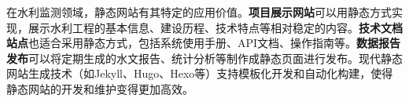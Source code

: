 在水利监测领域，静态网站有其特定的应用价值。\textbf{项目展示网站}可以用静态方式实现，展示水利工程的基本信息、建设历程、技术特点等相对稳定的内容。\textbf{技术文档站点}也适合采用静态方式，包括系统使用手册、API文档、操作指南等。\textbf{数据报告发布}可以将定期生成的水文报告、统计分析等制作成静态页面进行发布。现代静态网站生成技术（如Jekyll、Hugo、Hexo等）支持模板化开发和自动化构建，使得静态网站的开发和维护变得更加高效。

\begin{Shaded}
\begin{Highlighting}[]
\DataTypeTok{\textgreater{}}
\DataTypeTok{\textless{}}\OperatorTok{=}\DataTypeTok{\textgreater{}}
\DataTypeTok{\textless{}}\DataTypeTok{\textgreater{}}
    \DataTypeTok{\textless{}}\OperatorTok{=}\DataTypeTok{\textgreater{}}
    \DataTypeTok{\textless{}}\OperatorTok{=}\OperatorTok{=}\DataTypeTok{\textgreater{}}
    \DataTypeTok{\textless{}}\DataTypeTok{\textgreater{}}\DataTypeTok{\textless{}/}\DataTypeTok{\textgreater{}}
    \DataTypeTok{\textless{}}\OperatorTok{=}\OperatorTok{=}\DataTypeTok{\textgreater{}}
\DataTypeTok{\textless{}/}\DataTypeTok{\textgreater{}}
\DataTypeTok{\textless{}}\DataTypeTok{\textgreater{}}
    \DataTypeTok{\textless{}}\OperatorTok{=}\DataTypeTok{\textgreater{}}
        \DataTypeTok{\textless{}}\DataTypeTok{\textgreater{}}\DataTypeTok{\textless{}/}\DataTypeTok{\textgreater{}}
        \DataTypeTok{\textless{}}\DataTypeTok{\textgreater{}}
            \DataTypeTok{\textless{}}\DataTypeTok{\textgreater{}}
                \DataTypeTok{\textless{}}\DataTypeTok{\textgreater{}\textless{}}\OperatorTok{=}\DataTypeTok{\textgreater{}}\DataTypeTok{\textless{}/}\DataTypeTok{\textgreater{}\textless{}/}\DataTypeTok{\textgreater{}}

\end{Highlighting}
\end{Shaded}
